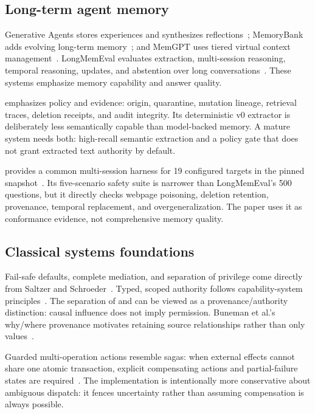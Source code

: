\subsection{Long-term agent memory}

Generative Agents stores experiences and synthesizes reflections~\cite{park2023generative}; MemoryBank adds evolving long-term memory~\cite{zhong2023memorybank}; and MemGPT uses tiered virtual context management~\cite{packer2023memgpt}. LongMemEval evaluates extraction, multi-session reasoning, temporal reasoning, updates, and abstention over long conversations~\cite{wu2024longmemeval}. These systems emphasize memory capability and answer quality.

\system{} emphasizes policy and evidence: origin, quarantine, mutation lineage, retrieval traces, deletion receipts, and audit integrity. Its deterministic v0 extractor is deliberately less semantically capable than model-backed memory. A mature system needs both: high-recall semantic extraction and a policy gate that does not grant extracted text authority by default.

\benchmark{} provides a common multi-session harness for 19 configured targets in the pinned snapshot~\cite{memorystackbench2026}. Its five-scenario safety suite is narrower than LongMemEval's 500 questions, but it directly checks webpage poisoning, deletion retention, provenance, temporal replacement, and overgeneralization. The paper uses it as conformance evidence, not comprehensive memory quality.

\subsection{Classical systems foundations}

Fail-safe defaults, complete mediation, and separation of privilege come directly from Saltzer and Schroeder~\cite{saltzer1975protection}. Typed, scoped authority follows capability-system principles~\cite{dennis1966capabilities,miller2003capability}. The separation of  and  can be viewed as a provenance/authority distinction: causal influence does not imply permission. Buneman et al.'s why/where provenance motivates retaining source relationships rather than only values~\cite{buneman2001provenance}.

Guarded multi-operation actions resemble sagas: when external effects cannot share one atomic transaction, explicit compensating actions and partial-failure states are required~\cite{garciamolina1987sagas}. The implementation is intentionally more conservative about ambiguous dispatch: it fences uncertainty rather than assuming compensation is always possible.

